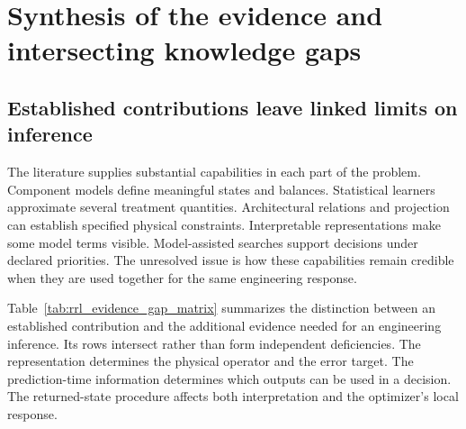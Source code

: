 \section{Synthesis of the evidence and intersecting knowledge gaps}

\subsection{Established contributions leave linked limits on inference}

The literature supplies substantial capabilities in each part of the problem. Component models define meaningful states and balances. Statistical learners approximate several treatment quantities. Architectural relations and projection can establish specified physical constraints. Interpretable representations make some model terms visible. Model-assisted searches support decisions under declared priorities. The unresolved issue is how these capabilities remain credible when they are used together for the same engineering response.

Table~\ref{tab:rrl_evidence_gap_matrix} summarizes the distinction between an established contribution and the additional evidence needed for an engineering inference. Its rows intersect rather than form independent deficiencies. The representation determines the physical operator and the error target. The prediction-time information determines which outputs can be used in a decision. The returned-state procedure affects both interpretation and the optimizer's local response.

